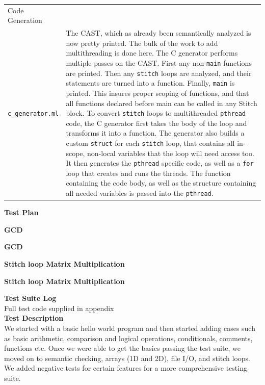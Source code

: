 \documentclass[11pt, oneside]{article}   	%
\begin{document}
\begin{tabular}{ l p{12cm} }
Code Generation\\\verb|c_generator.ml| & The CAST, which as already been semantically analyzed is now pretty printed.  The bulk of the work to add multithreading is done here.  The C generator performs multiple passes on the CAST.  First any non-\verb|main| functions are printed.  Then any \verb|stitch| loops are analyzed, and their statements are turned into a function.  Finally, \verb|main| is printed.  This insures proper scoping of functions, and that all functions declared before main can be called in any Stitch block.  To convert \verb|stitch| loops to multithreaded \verb|pthread| code, the C generator first takes the body of the loop and transforms it into a function.  The generator also builds a custom \verb|struct| for each \verb|stitch| loop, that contains all in-scope, non-local variables that the loop will need access too.  It then generates the \verb|pthread| specific code, as well as a \verb|for| loop that creates and runs the threads.  The function containing the code body, as well as the structure containing all needed variables is passed into the \verb|pthread|.
\end{tabular}
\newpage


\LARGE\textbf{Test Plan}\\[2em]
\normalsize

\Large\textbf{GCD}\\[1em]
\normalsize

\newpage
\Large\textbf{GCD}\\[1em]
\normalsize

\newpage
\Large\textbf{Stitch loop Matrix Multiplication}\\[1em]
\normalsize

\newpage
\Large\textbf{Stitch loop Matrix Multiplication}\\[1em]
\normalsize

\newpage
\Large\textbf{Test Suite Log}\\[1em]
\normalsize
Full test code supplied in appendix\\

\newpage
\Large\textbf{Test Description}\\[1em]
\normalsize
We started with a basic hello world program and then started adding cases such as basic arithmetic, comparison and logical operations, conditionals, comments, functions etc. Once we were able to get the basics passing the test suite, we moved on to semantic checking, arrays (1D and 2D), file I/O, and stitch loops. We added negative tests for certain features for a more comprehensive testing suite.\\
\end{document}
